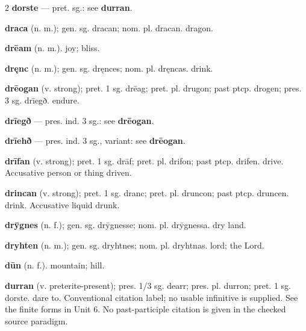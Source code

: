 \begin{multicols*}{2}
\textbf{dorste} — pret. sg.: see \textbf{durran}.\par
\textbf{draca} (n. m.); gen. sg. dracan; nom. pl. dracan. dragon.\par
\textbf{drēam} (n. m.). joy; bliss.\par
\textbf{dręnc} (n. m.); gen. sg. dręnces; nom. pl. dręncas. drink.\par
\textbf{drēogan} (v. strong); pret. 1 sg. drēag; pret. pl. drugon; past ptcp. drogen; pres. 3 sg. drīegð. endure.\par
\textbf{drīegð} — pres. ind. 3 sg.: see \textbf{drēogan}.\par
\textbf{drīehð} — pres. ind. 3 sg., variant: see \textbf{drēogan}.\par
\textbf{drīfan} (v. strong); pret. 1 sg. drāf; pret. pl. drifon; past ptcp. drifen. drive. Accusative person or thing driven.\par
\textbf{drincan} (v. strong); pret. 1 sg. dranc; pret. pl. druncon; past ptcp. druncen. drink. Accusative liquid drunk.\par
\textbf{drȳgnes} (n. f.); gen. sg. drȳgnesse; nom. pl. drȳgnessa. dry land.\par
\textbf{dryhten} (n. m.); gen. sg. dryhtnes; nom. pl. dryhtnas. lord; the Lord.\par
\textbf{dūn} (n. f.). mountain; hill.\par
\textbf{durran} (v. preterite-present); pres. 1/3 sg. dearr; pres. pl. durron; pret. 1 sg. dorste. dare to. Conventional citation label; no usable infinitive is supplied. See the finite forms in Unit 6. No past-participle citation is given in the checked source paradigm.\par

\end{multicols*}
